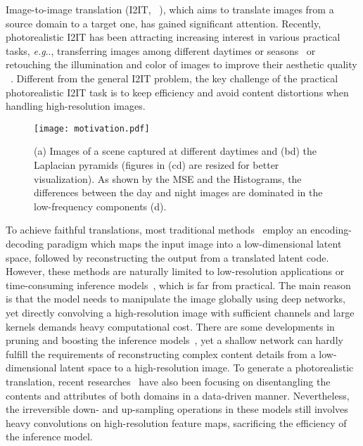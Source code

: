 \documentclass[10pt,twocolumn,letterpaper]{article}
\makeatletter
\DeclareRobustCommand\onedot{\futurelet\@let@token\@onedot}
\def\@onedot{\ifx\@let@token.\else.\null\fi\xspace}
\def\eg{\emph{e.g}\onedot} \def\Eg{\emph{E.g}\onedot}
\makeatother
\begin{document}
	Image-to-image translation (I2IT, ~\cite{zhang2019harmonic, hoffman2017cycada, ma2018exemplar}), which aims to translate images from a source domain to a target one, has gained significant attention. Recently, photorealistic I2IT has been attracting increasing interest in various practical tasks, \eg, transferring images among different daytimes or seasons~\cite{hoffman2017cycada} or retouching the illumination and color of images to improve their aesthetic quality ~\cite{chen2018deep}. Different from the general I2IT problem, the key challenge of the practical photorealistic I2IT task is to keep efficiency and avoid content distortions when handling high-resolution images.
	
	
	\begin{figure}[t]
		\centering
		\texttt{[image: motivation.pdf]}
		\caption{(a) Images of a scene captured at different daytimes and (bd) the Laplacian pyramids (figures in (cd) are resized for better visualization).
As shown by the MSE and the Histograms, the differences between the day and night images are dominated in the low-frequency components (d).
			\label{motivation}
		}
	\end{figure}
	
	To achieve faithful translations, most traditional methods~\cite{zhu2017unpaired, wang2018high, isola2017image} employ an encoding-decoding paradigm which maps the input image into a low-dimensional latent space, followed by reconstructing the output from a translated latent code. However, these methods are naturally limited to low-resolution applications or time-consuming inference models~\cite{zhu2017unpaired, wang2018high, isola2017image, li2018closed, luan2017deep, lee2018diverse}, which is far from practical. The main reason is that the model needs to manipulate the image globally using deep networks, yet directly convolving a high-resolution image with sufficient channels and large kernels demands heavy computational cost. There are some developments in pruning and boosting the inference models~\cite{johnson2016perceptual, huang2017real, li2019learning}, yet a shallow network can hardly fulfill the requirements of reconstructing complex content details from a low-dimensional latent space to a high-resolution image. To generate a photorealistic translation, recent researches~\cite{gonzalez2018image, huang2017arbitrary, huang2018multimodal} have also been focusing on disentangling the contents and attributes of both domains in a data-driven manner. Nevertheless, the irreversible down- and up-sampling operations in these models still involves heavy convolutions on high-resolution feature maps, sacrificing the efficiency of the inference model.
\end{document}
